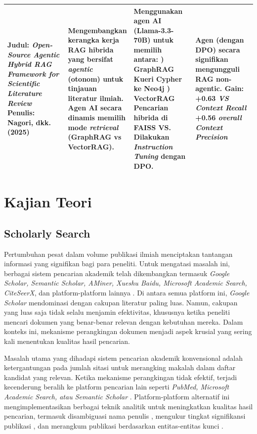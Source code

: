 \begin{longtable}{|P{0.25\linewidth}|P{0.25\linewidth}|P{0.25\linewidth}|P{0.25\linewidth}|}
\textbf{Judul:} \textit{Open-Source Agentic Hybrid RAG Framework for Scientific Literature Review} \newline
\textbf{Penulis:} Nagori, dkk. (2025)
& 
Mengembangkan kerangka kerja RAG hibrida yang bersifat \textit{agentic} (otonom) untuk tinjauan literatur ilmiah. Agen AI secara dinamis memilih mode \textit{retrieval} (GraphRAG vs VectorRAG).
& 
Menggunakan agen AI (Llama-3.3-70B) untuk memilih antara: ) \textbf{GraphRAG} Kueri Cypher ke Neo4j ) \textbf{VectorRAG} Pencarian hibrida di FAISS VS. \newline
Dilakukan \textit{Instruction Tuning} dengan DPO.
& 
Agen (dengan DPO) secara signifikan mengungguli RAG non-agentic. \newline
\textbf{Gain:} \newline
+0.63 \textit{VS Context Recall} \newline
+0.56 \textit{overall Context Precision}
\\ \hline
\end{longtable}
		
\section{Kajian Teori}

\subsection{Scholarly Search}
Pertumbuhan pesat dalam volume publikasi ilmiah menciptakan tantangan informasi yang signifikan bagi para peneliti. Untuk mengatasi masalah ini, berbagai sistem pencarian akademik telah dikembangkan termasuk \textit{Google Scholar, Semantic Scholar, AMiner, Xueshu Baidu, Microsoft Academic Search, CiteSeerX}, dan platform-platform lainnya \cite{10.1007/s11192-020-03690-4}. Di antara semua platform ini, \textit{Google Scholar} mendominasi dengan cakupan literatur paling luas. Namun, cakupan yang luas saja tidak selalu menjamin efektivitas, khususnya ketika peneliti mencari dokumen yang benar-benar relevan dengan kebutuhan mereka. Dalam konteks ini, mekanisme perangkingan dokumen menjadi aspek krusial yang sering kali menentukan kualitas hasil pencarian.

Masalah utama yang dihadapi sistem pencarian akademik konvensional adalah ketergantungan pada jumlah sitasi untuk merangking makalah dalam daftar kandidat yang relevan. Ketika mekanisme perangkingan tidak efektif, terjadi kecenderung beralih ke platform pencarian lain seperti \textit{PubMed, Microsoft Academic Search, atau Semantic Scholar} \cite{https://doi.org/10.1609/aimag.v36i3.2601, 10.1145/1401890.1402008, 10.1145/2740908.2742839, Lu2011, 10.1145/3038912.3052558}. Platform-platform alternatif ini mengimplementasikan berbagai teknik analitik untuk meningkatkan kualitas hasil pencarian, termasuk disambiguasi nama penulis \cite{10.1145/1401890.1402008}, mengukur tingkat signifikansi publikasi \cite{Shen2016ModelingTA}, dan merangkum publikasi berdasarkan entitas-entitas kunci \cite{ren-etal-2017-life}.

